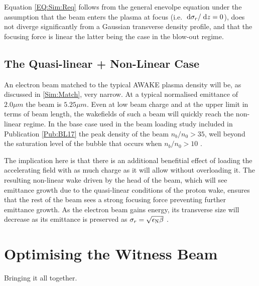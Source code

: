 Equation \ref{EQ:Sim:Req} follows from the general enevolpe equation \cite{lee:1976} under the assumption that the beam enters the plasma at focus (i.e. $\;\mathrm{d}\sigma_{r}/\;\mathrm{d}z = 0$), does not diverge significantly from a Gaussian transverse density profile, and that the focusing force is linear \cite{krall:1995} \dash the latter being the case in the blow-out regime.


\subsection{The Quasi-linear + Non-Linear Case}
\label{Sim:QLinNonLin}

An electron beam matched to the typical AWAKE plasma density will be, as discussed in \ref{Sim:Match}, very narrow. At a typical normalised emittance of $2.0\unit{\mu m}$ the beam is $5.25\unit{\mu m}$. Even at low beam charge and at the upper limit in terms of beam length, the wakefields of such a beam will quickly reach the non-linear regime. In the base case used in the beam loading study included in Publication \ref{Pub:BL17} \cite{berglyd_olsen:2018} the peak density of the beam $n_b/n_0 > 35$, well beyond the saturation level of the bubble that occurs when $n_b/n_0 > 10$ \cite{lu:2005}.

The implication here is that there is an additional benefitial effect of loading the accelerating field with as much charge as it will allow without overloading it. The resulting non-linear wake driven by the head of the beam, which will see emittance growth due to the quasi-linear conditions of the proton wake, ensures that the rest of the beam sees a strong focusing force preventing further emittance growth. As the electron beam gains energy, its transverse size will decrease as its emittance is preserved as $\sigma_{r} = \sqrt{\epsilon_{\mathrm{N}}\beta}$ \cite{wille:2001}.


\section{Optimising the Witness Beam}
\label{Sim:Opt}

Bringing it all together.

